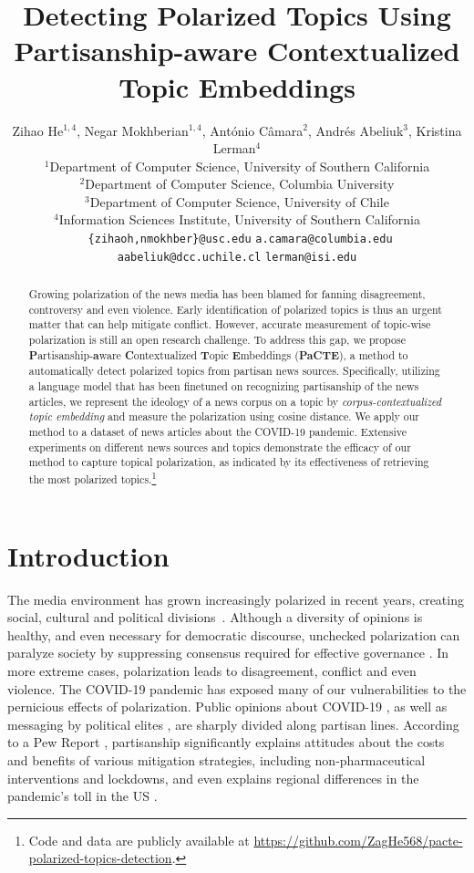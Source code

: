 \documentclass[11pt]{article}
\title{Detecting Polarized Topics Using Partisanship-aware Contextualized Topic Embeddings}
\author{
  Zihao He$^{1,4}$, Negar Mokhberian$^{1,4}$, Ant\'onio C\^amara$^{2}$, Andr\'es Abeliuk$^{3}$, Kristina Lerman$^{4}$ \\
  $^1$Department of Computer Science, University of Southern California \\
  $^2$Department of Computer Science, Columbia University \\
  $^3$Department of Computer Science, University of Chile\\
  $^4$Information Sciences Institute, University of Southern California\\
  \texttt{ \{zihaoh,nmokhber\}@usc.edu}   \quad  \texttt{a.camara@columbia.edu} \\
  \texttt{aabeliuk@dcc.uchile.cl} \quad  \texttt{lerman@isi.edu}\\
  }
\begin{document}
\maketitle
\begin{abstract}
Growing polarization of the news media has been blamed for fanning disagreement, controversy and even violence. Early identification of polarized topics is thus an urgent matter that can help mitigate conflict. However, accurate measurement of topic-wise polarization is still an open research challenge. To address this gap, we propose \textbf{P}artisanship-\textbf{a}ware \textbf{C}ontextualized \textbf{T}opic \textbf{E}mbeddings (\textbf{PaCTE}), a method to automatically detect polarized topics from partisan news sources. Specifically, utilizing a language model that has been finetuned on recognizing partisanship of the news articles, we represent the ideology of a news corpus on a topic by \emph{corpus-contextualized topic embedding} and measure the polarization using cosine distance. We apply our method to a dataset of news articles about the COVID-19 pandemic. Extensive experiments on different news sources and topics demonstrate the efficacy of our method to capture topical polarization, as indicated by its effectiveness of retrieving the most polarized topics.\footnote{Code and data are publicly available at \url{https://github.com/ZagHe568/pacte-polarized-topics-detection}.}
\end{abstract}

\section{Introduction}
The media environment has grown increasingly polarized in recent years, creating social, cultural and political divisions~\cite{prior2013media, fiorina2008political}. Although a diversity of opinions is healthy, and even necessary for democratic discourse, unchecked polarization can paralyze society by suppressing consensus required for effective governance \cite{tworzecki2019poland}. In more extreme cases, polarization leads to disagreement, conflict and even violence. The COVID-19 pandemic has exposed many of our vulnerabilities to the pernicious effects of polarization. Public opinions about COVID-19 \cite{jiang2020political}, as well as messaging by political elites \cite{green2020elusive, bhanot2020partisan}, are sharply divided along partisan lines.  According to a Pew Report \cite{pew2020}, partisanship significantly explains attitudes about the costs and benefits of various mitigation strategies, including non-pharmaceutical interventions and lockdowns, and even explains regional differences in the pandemic's toll in the US \cite{gollwitzer2020partisan}. 
\end{document}
